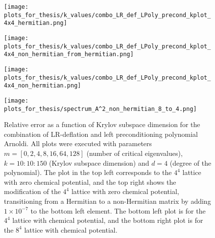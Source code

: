 \begin{figure}[H]
    \centering
    \begin{minipage}{0.45\textwidth}
        \centering
        \texttt{[image: plots\_for\_thesis/k\_values/combo\_LR\_def\_LPoly\_precond\_kplot\_4x4\_hermitian.png]} %
    \end{minipage}%
    \hspace{0.02\textwidth} %
    \begin{minipage}{0.45\textwidth}
        \centering
        \texttt{[image: plots\_for\_thesis/k\_values/combo\_LR\_def\_LPoly\_precond\_kplot\_4x4\_non\_hermitian\_from\_hermitian.png]} %
    \end{minipage}
    
    \vspace{0.02\textwidth} %
    
    \begin{minipage}{0.45\textwidth}
        \centering
        \texttt{[image: plots\_for\_thesis/k\_values/combo\_LR\_def\_LPoly\_precond\_kplot\_4x4\_non\_hermitian.png]} %
    \end{minipage}%
    \hspace{0.02\textwidth} %
    \begin{minipage}{0.45\textwidth}
        \centering
        \texttt{[image: plots\_for\_thesis/spectrum\_A^2\_non\_hermitian\_8\_to\_4.png]} %
    \end{minipage}
    
    \caption{\small Relative error as a function of Krylov subspace dimension for the combination of LR-deflation and left preconditioning polynomial Arnoldi. All plots were executed with parameters $m = [0, 2, 4, 8, 16, 64, 128]$ (number of critical eigenvalues), $k = 10:10:150$ (Krylov subspace dimension) and $d = 4$ (degree of the polynomial). The plot in the top left corresponds to the $4^4$ lattice with zero chemical potential, and the top right shows the modification of the $4^4$ lattice with zero chemical potential, transitioning from a Hermitian to a non-Hermitian matrix by adding $1 \times 10^{-7}$ to the bottom left element. The bottom left plot is for the $4^4$ lattice with chemical potential, and the bottom right plot is for the $8^4$ lattice with chemical potential.}
    \label{fig:combo_LR+left_pre_cond_k_plot}
\end{figure}

